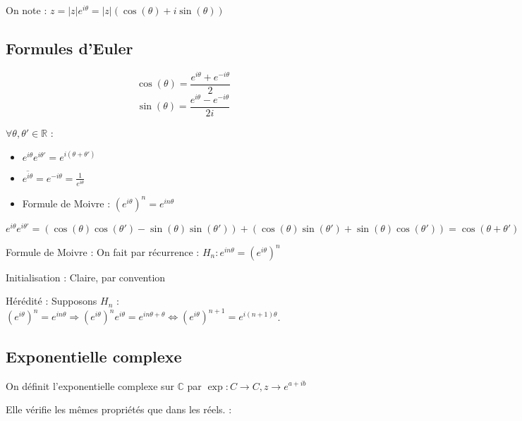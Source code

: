 \documentclass[french]{yLectureNote}
\begin{document}
On note : $z = |z| e^{i\theta} = |z|( \cos(\theta) + i\sin(\theta))$
\subsection{Formules d'Euler}
\begin{theorem}
\[\cos(\theta) = \frac{e^{i\theta}+e^{-i\theta}}{2}\]
\[\sin(\theta) = \frac{e^{i\theta}-e^{-i\theta}}{2i}\]
\end{theorem}
\begin{theorem}[Propriétés]
$\forall \theta,\theta' \in\mathbb{R}$ :
\begin{itemize}
 \item $e^{i\theta}e^{i\theta'} = e^{i(\theta+\theta')}$
 \item $\overline{e^{i\theta}} = e^{-i\theta} = \frac{1}{e^{i\theta}}$
 \item Formule de Moivre : $(e^{i\theta})^n = e^{in\theta}$
\end{itemize}

\end{theorem}
\begin{myproof}

$e^{i\theta}e^{i\theta'} = (\cos(\theta)\cos(\theta') - \sin(\theta)\sin(\theta')) + (\cos(\theta)\sin(\theta') + \sin(\theta)\cos(\theta')) = \cos(\theta+\theta') + i\sin(\theta+\theta') = e^{i(\theta+\theta')}$

Formule de Moivre : On fait par récurrence : $H_n : e^{in\theta} = (e^{i\theta})^n$

Initialisation : Claire, par convention

Hérédité : Supposons $H_n$ : $(e^{i\theta})^n = e^{in\theta} \Rightarrow (e^{i\theta})^ne^{i\theta} = e^{in\theta+\theta} \iff (e^{i\theta})^{n+1} = e^{i(n+1)\theta}$.
\end{myproof}
%
%
%
%
%
\subsection{Exponentielle complexe}
On définit l'exponentielle complexe sur $\mathbb{C}$ par $\exp : C\to C, z \to e^{a+ib}$

Elle vérifie les m\^emes propriétés que dans les réels. :
\end{document}
